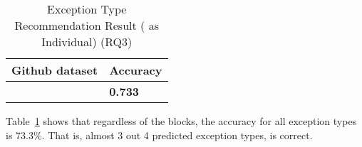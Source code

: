 \begin{table}[t]%
  \caption{Exception Type Recommendation Result ({\xtype} as Individual) (RQ3)}
  \vspace{-12pt}
  \small
	\begin{center}
		\renewcommand{\arraystretch}{1}
		\begin{tabular}{| p{3.05cm}<{\centering} | p{1.2cm}<{\centering}|}
		  \hline
			Github dataset  & Accuracy \\
			\hline
			\xtype   & \textbf{0.733} \\
			\hline
		\end{tabular}
		\label{tab:xtype-3}
	\end{center}
\end{table}

Table~\ref{tab:xtype-3} shows that regardless of the blocks, the
accuracy for all exception types is 73.3\%. That is, almost 3 out 4
predicted exception types, {\xtype} is correct.
